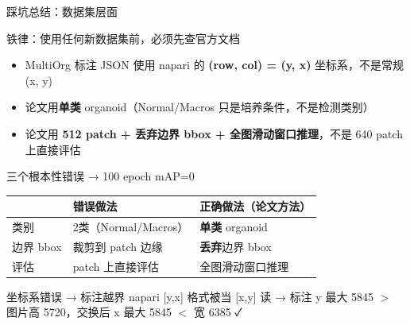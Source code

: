 \documentclass[aspectratio=169, 10pt]{beamer}
\begin{document}
\begin{frame}{踩坑总结：数据集层面}
  \begin{alertblock}{铁律：使用任何新数据集前，必须先查官方文档}
    \begin{itemize}
      \item MultiOrg 标注 JSON 使用 napari 的 \textbf{(row, col) = (y, x)} 坐标系，不是常规 (x, y)
      \item 论文用\textbf{单类} organoid（Normal/Macros 只是培养条件，不是检测类别）
      \item 论文用 \textbf{512 patch + 丢弃边界 bbox + 全图滑动窗口推理}，不是 640 patch 上直接评估
    \end{itemize}
  \end{alertblock}
  \vspace{0em}
  \begin{block}{三个根本性错误 → 100 epoch mAP=0}
    \begin{tabular}{p{3.5cm}p{4cm}p{4cm}}
      \toprule
      & \textbf{错误做法} & \textbf{正确做法（论文方法）} \\
      \midrule
      类别 & 2类（Normal/Macros） & \textbf{单类} organoid \\
      边界 bbox & 裁剪到 patch 边缘 & \textbf{丢弃}边界 bbox \\
      评估 & patch 上直接评估 & 全图滑动窗口推理 \\
      \bottomrule
    \end{tabular}
  \end{block}
  \vspace{0em}
  \begin{block}{坐标系错误 → 标注越界}
    napari [y,x] 格式被当 [x,y] 读 → 标注 y 最大 5845 $>$ 图片高 5720，交换后 x 最大 5845 $<$ 宽 6385 ✓
  \end{block}
\end{frame}
\end{document}
